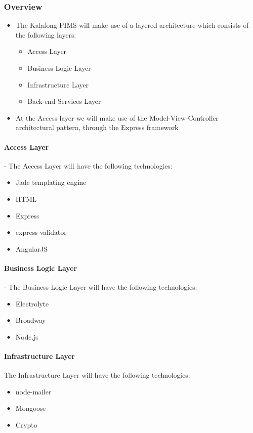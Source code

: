 \subsubsection{Overview}
\begin{itemize}
	\item The Kalafong PIMS will make use of a layered architecture which consists of the following layers: 
		\begin{itemize}
			\item Access Layer 
			\item Business Logic Layer
			\item Infrastructure Layer				
			\item Back-end Services Layer
		\end{itemize}
	\item At the Access layer we will make use of the Model-View-Controller architectural pattern, through the Express framework
\end{itemize}

\paragraph{Access Layer} -
The Access Layer will have the following technologies:
\begin{itemize}
	\item Jade templating engine
	\item HTML
	\item Express
	\item express-validator
	\item AngularJS			
\end{itemize}

\paragraph{Business Logic Layer} -
The Business Logic Layer will have the following technologies:
\begin{itemize}
	\item Electrolyte
	\item Broadway
	\item Node.js 
\end{itemize}

\paragraph{Infrastructure Layer}
The Infrastructure Layer will have the following technologies:
\begin{itemize}
	\item node-mailer
	\item Mongoose
	\item Crypto
\end{itemize}

